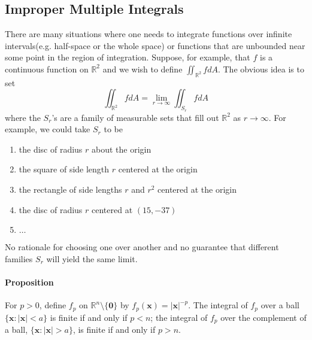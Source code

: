 \documentclass[11pt]{article}
\newcommand{\tb}[1]{\textbf{#1}}
\newcommand{\real}[0]{\mathbb{R}}
\newcommand{\vx}[0]{\tb{x}}
\newcommand{\vo}[0]{\tb{0}}
\begin{document}
\subsection{Improper Multiple Integrals}
There are many situations where one needs to integrate functions over infinite intervals(e.g. half-space or the whole space) or functions that are unbounded near some point in the region of integration. Suppose, for example, that $f$ is a continuous function on $\real^2$ and we wish to define $\iint_{\real^2}fdA$. The obvious idea is to set $$\iint_{\real^2} fdA = \underset{r\rightarrow\infty}{\lim} \iint_{S_r}fdA$$ where the $S_r$'s are a family of measurable sets that fill out $\real^2$ as $r \rightarrow \infty$. For example, we could take $S_r$ to be 
\begin{enumerate}
    \item the disc of radius $r$ about the origin
    \item the square of side length $r$ centered at the origin
    \item the rectangle of side lengths $r$ and $r^2$ centered at the origin
    \item the disc of radius $r$ centered at $(15, -37)$
    \item $\hdots$
\end{enumerate}
No rationale for choosing one over another and no guarantee that different families $S_r$ will yield the same limit.
\paragraph{Proposition} For $p > 0$, define $f_p$ on $\real^n \setminus \{\vo\}$ by $f_p(\vx) = |\vx|^{-p}$. The integral of $f_p$ over a ball $\{\vx:|\vx| < a\}$ is finite if and only if $p<n$; the integral of $f_p$ over the complement of a ball, $\{\vx:|\vx| > a\}$, is finite if and only if $p>n$.
\end{document}

